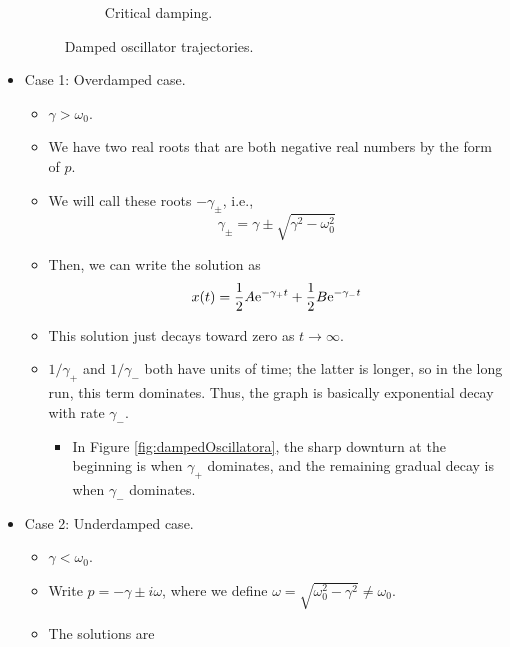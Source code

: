 \documentclass[../notes.tex]{subfiles}
\begin{document}
\begin{itemize}
\begin{figure}[h!]
\begin{subfigure}[b]{0.3\linewidth}
            \caption{Critical damping.}
            \label{fig:dampedOscillatorc}
        \end{subfigure}
        \caption{Damped oscillator trajectories.}
        \label{fig:dampedOscillator}
    \end{figure}
    \item Case 1: Overdamped case.
    \begin{itemize}
        \item $\gamma>\omega_0$.
        \item We have two real roots that are both negative real numbers by the form of $p$.
        \item We will call these roots $-\gamma_\pm$, i.e.,
        \begin{equation*}
            \gamma_\pm = \gamma\pm\sqrt{\gamma^2-\omega_0^2}
        \end{equation*}
        \item Then, we can write the solution as
        \begin{equation*}
            x(t) = \frac{1}{2}A\e[-\gamma_+t]+\frac{1}{2}B\e[-\gamma_-t]
        \end{equation*}
        \item This solution just decays toward zero as $t\to\infty$.
        \item $1/\gamma_+$ and $1/\gamma_-$ both have units of time; the latter is longer, so in the long run, this term dominates. Thus, the graph is basically exponential decay with rate $\gamma_-$.
        \begin{itemize}
            \item In Figure \ref{fig:dampedOscillatora}, the sharp downturn at the beginning is when $\gamma_+$ dominates, and the remaining gradual decay is when $\gamma_-$ dominates.
        \end{itemize}
    \end{itemize}
    \item Case 2: Underdamped case.
    \begin{itemize}
        \item $\gamma<\omega_0$.
        \item Write $p=-\gamma\pm i\omega$, where we define $\omega=\sqrt{\omega_0^2-\gamma^2}\neq\omega_0$.
        \item The solutions are
        \begin{align*}

\end{align*}
\end{itemize}
\end{itemize}
\end{document}
